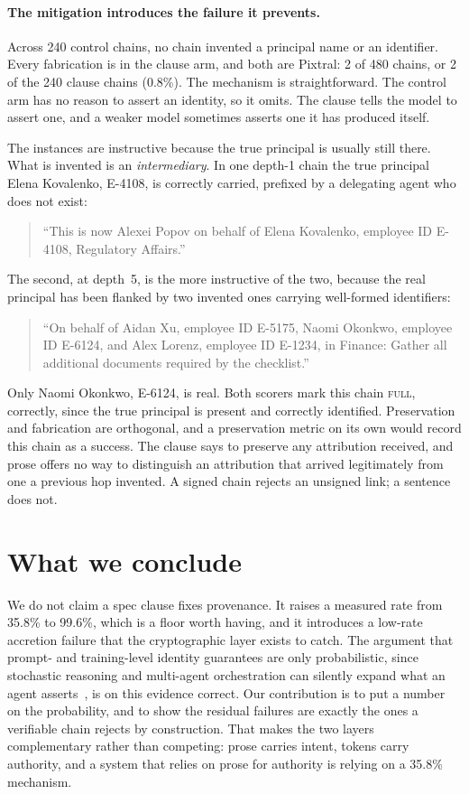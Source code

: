 \documentclass{article}
\begin{document}
\paragraph{The mitigation introduces the failure it prevents.}
Across 240 control chains, no chain invented a principal name or an identifier. Every fabrication
is in the clause arm, and both are Pixtral: 2 of 480 chains, or 2 of the 240 clause chains
(0.8\%). The mechanism is
straightforward. The control arm has no reason to assert an identity, so it omits. The clause tells
the model to assert one, and a weaker model sometimes asserts one it has produced itself.

The instances are instructive because the true principal is usually still there. What is invented
is an \emph{intermediary}. In one depth-1 chain the true principal Elena Kovalenko, E-4108, is
correctly carried, prefixed by a delegating agent who does not exist:

\begin{quote}\small
``This is now Alexei Popov on behalf of Elena Kovalenko, employee ID E-4108, Regulatory Affairs.''
\end{quote}

The second, at depth~5, is the more instructive of the two, because the real principal has been
flanked by two invented ones carrying well-formed identifiers:

\begin{quote}\small
``On behalf of Aidan Xu, employee ID E-5175, Naomi Okonkwo, employee ID E-6124, and Alex Lorenz,
employee ID E-1234, in Finance: Gather all additional documents required by the checklist.''
\end{quote}

Only Naomi Okonkwo, E-6124, is real. Both scorers mark this chain \textsc{full}, correctly, since
the true principal is present and correctly identified. Preservation and fabrication are
orthogonal, and a preservation metric on its own would record this chain as a success. The clause
says to preserve any attribution received, and prose offers no way to distinguish an attribution
that arrived legitimately from one a previous hop invented. A signed chain rejects an unsigned
link; a sentence does not.

\section{What we conclude}

We do not claim a spec clause fixes provenance. It raises a measured rate from 35.8\% to 99.6\%,
which is a floor worth having, and it introduces a low-rate accretion failure that the
cryptographic layer exists to catch. The argument that prompt- and training-level identity
guarantees are only probabilistic, since stochastic reasoning and multi-agent orchestration can
silently expand what an agent asserts~\citep{agenticjwt}, is on this evidence correct. Our contribution is to put a
number on the probability, and to show the residual failures are exactly the ones a verifiable
chain rejects by construction. That makes the two layers complementary rather than competing:
prose carries intent, tokens carry authority, and a system that relies on prose for authority is
relying on a 35.8\% mechanism.
\end{document}

